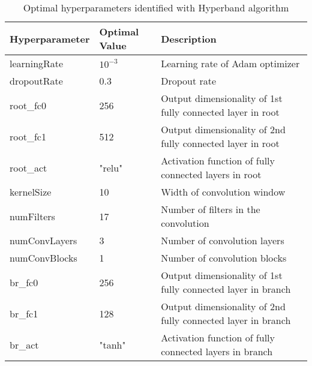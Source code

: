 \begin{table}[h]
  \centering
  \begin{tabular}{lll}
    \hline
    \textbf{Hyperparameter}   & \textbf{Optimal Value} & \textbf{Description}                \\
    \hline
    learningRate  & $10^{-3}$ & Learning rate of Adam optimizer                              \\
    dropoutRate   & 0.3       & Dropout rate                                                 \\
    root\_fc0     & 256       & Output dimensionality of 1st fully connected layer in root   \\
    root\_fc1     & 512       & Output dimensionality of 2nd fully connected layer in root   \\
    root\_act     & "relu"    & Activation function of fully connected layers in root        \\
    kernelSize    & 10        & Width of convolution window                                  \\
    numFilters    & 17        & Number of filters in the convolution                         \\
    numConvLayers & 3         & Number of convolution layers                                 \\
    numConvBlocks & 1         & Number of convolution blocks                                 \\
    br\_fc0       & 256       & Output dimensionality of 1st fully connected layer in branch \\
    br\_fc1       & 128       & Output dimensionality of 2nd fully connected layer in branch \\
    br\_act       & "tanh"    & Activation function of fully connected layers in branch      \\
    \hline
  \end{tabular}
  \caption{Optimal hyperparameters identified with Hyperband algorithm}
  \label{si_table17}
\end{table}


